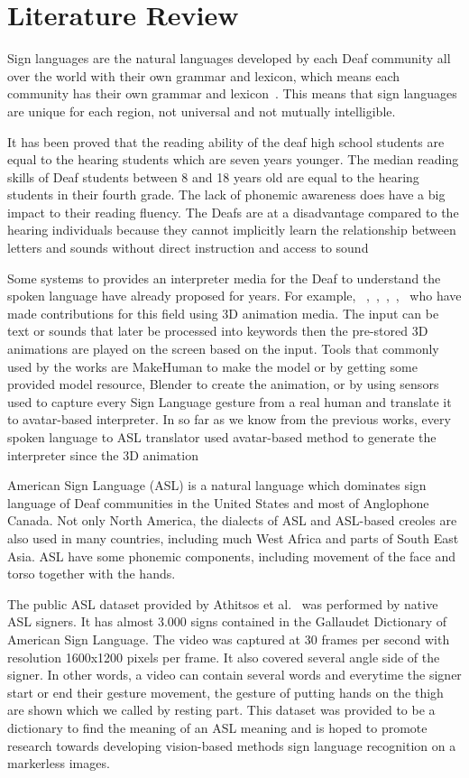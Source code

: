 \documentclass{sig-alternate-05-2015}
\begin{document}
\section{Literature Review}
Sign languages are the natural languages developed by each Deaf community all over the world with their own grammar and lexicon, which means each community has their own grammar and lexicon~\cite{WendySandler:2006}. This means that sign languages are unique for each region, not universal and not mutually intelligible.

It has been proved that the reading ability of the deaf high school students are equal to the hearing students which are seven years younger. The median reading skills of Deaf students between 8 and 18 years old are equal to the hearing students in their fourth grade. The lack of phonemic awareness does have a big impact to their reading fluency. The Deafs are at a disadvantage compared to the hearing individuals because they cannot implicitly learn the relationship between letters and sounds without direct instruction and access to sound

Some systems to provides an interpreter media for the Deaf to understand the spoken language have already proposed for years. For example, ~\cite{DeafTalkUsing3DAnimatedSignLanguage},~\cite{ChineseLanguageAnimation},~\cite{tessa},~\cite{signlanguageanimationusingtvml},~\cite{3danimationframeworkforsignlanguage} who have made contributions for this field using 3D animation media. The input can be text or sounds that later be processed into keywords then the pre-stored 3D animations are played on the screen based on the input. Tools that commonly used by the works are MakeHuman to make the model or by getting some provided model resource, Blender to create the animation, or by using sensors used to capture every Sign Language gesture from a real human and translate it to avatar-based interpreter. In so far as we know from the previous works, every spoken language to ASL translator used avatar-based method to generate the interpreter since the 3D animation

American Sign Language (ASL) is a natural language which dominates sign language of Deaf communities in the United States and most of Anglophone Canada. Not only North America, the dialects of ASL and ASL-based creoles are also used in many countries, including much West Africa and parts of South East Asia. ASL have some phonemic components, including movement of the face and torso together with the hands.

The public ASL dataset provided by Athitsos et al.~\cite{ASLLexiconVideoDataset} was performed by native ASL signers. It has almost 3.000 signs contained in the Gallaudet Dictionary of American Sign Language. The video was captured at 30 frames per second with resolution 1600x1200 pixels per frame. It also covered several angle side of the signer. In other words, a video can contain several words and everytime the signer start or end their gesture movement, the gesture of putting hands on the thigh are shown which we called by resting part. This dataset was provided to be a dictionary to find the meaning of an ASL meaning and is hoped to promote research towards developing vision-based methods sign language recognition on a markerless images. 
\end{document}
